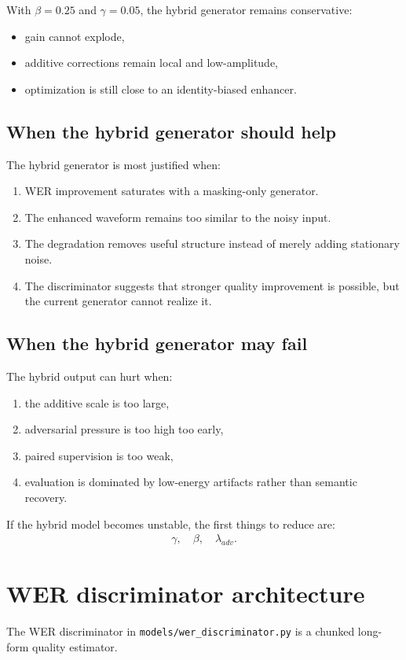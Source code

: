 \documentclass[11pt]{article}
\begin{document}
With $\beta = 0.25$ and $\gamma = 0.05$, the hybrid generator remains conservative:
\begin{itemize}[leftmargin=*]
    \item gain cannot explode,
    \item additive corrections remain local and low-amplitude,
    \item optimization is still close to an identity-biased enhancer.
\end{itemize}

\subsection{When the hybrid generator should help}
The hybrid generator is most justified when:
\begin{enumerate}[leftmargin=*]
    \item WER improvement saturates with a masking-only generator.
    \item The enhanced waveform remains too similar to the noisy input.
    \item The degradation removes useful structure instead of merely adding stationary noise.
    \item The discriminator suggests that stronger quality improvement is possible, but the current generator cannot realize it.
\end{enumerate}

\subsection{When the hybrid generator may fail}
The hybrid output can hurt when:
\begin{enumerate}[leftmargin=*]
    \item the additive scale is too large,
    \item adversarial pressure is too high too early,
    \item paired supervision is too weak,
    \item evaluation is dominated by low-energy artifacts rather than semantic recovery.
\end{enumerate}

If the hybrid model becomes unstable, the first things to reduce are:
\begin{align}
    \gamma,\quad \beta,\quad \lambda_{adv}.
\end{align}

\section{WER discriminator architecture}
The WER discriminator in \texttt{models/wer\_discriminator.py} is a chunked long-form quality estimator.
\end{document}

